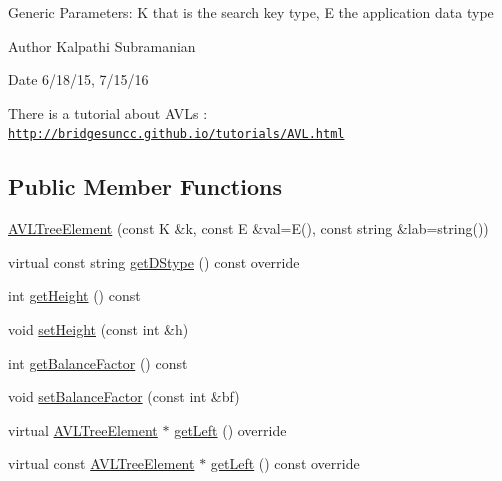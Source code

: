 Generic Parameters\+: K that is the search key type, E the application data type

\begin{DoxyAuthor}{Author}
Kalpathi Subramanian 
\end{DoxyAuthor}
\begin{DoxyDate}{Date}
6/18/15, 7/15/16
\end{DoxyDate}
There is a tutorial about A\+V\+Ls \+: \href{http://bridgesuncc.github.io/tutorials/AVL.html}{\tt http\+://bridgesuncc.\+github.\+io/tutorials/\+A\+V\+L.\+html} \subsection*{Public Member Functions}
\begin{DoxyCompactItemize}
\item 
\mbox{\hyperlink{classbridges_1_1datastructure_1_1_a_v_l_tree_element_a611fc818eeb478e330ef585adcefd9e6}{A\+V\+L\+Tree\+Element}} (const K \&k, const E \&val=E(), const string \&lab=string())
\item 
virtual const string \mbox{\hyperlink{classbridges_1_1datastructure_1_1_a_v_l_tree_element_ab04d1e9ad4630e408041e8137dc9854a}{get\+D\+Stype}} () const override
\item 
int \mbox{\hyperlink{classbridges_1_1datastructure_1_1_a_v_l_tree_element_a5d4b990d49f6f3d2f23f4dd3e57414e8}{get\+Height}} () const
\item 
void \mbox{\hyperlink{classbridges_1_1datastructure_1_1_a_v_l_tree_element_af387bcd2b37b7284ea983acafecff93c}{set\+Height}} (const int \&h)
\item 
int \mbox{\hyperlink{classbridges_1_1datastructure_1_1_a_v_l_tree_element_ade3c059448d00ac50dac89e59864b11f}{get\+Balance\+Factor}} () const
\item 
void \mbox{\hyperlink{classbridges_1_1datastructure_1_1_a_v_l_tree_element_a32af51a86585479c28de425374df95e9}{set\+Balance\+Factor}} (const int \&bf)
\item 
virtual \mbox{\hyperlink{classbridges_1_1datastructure_1_1_a_v_l_tree_element}{A\+V\+L\+Tree\+Element}} $\ast$ \mbox{\hyperlink{classbridges_1_1datastructure_1_1_a_v_l_tree_element_ab05925e343b9fa71b61c71e8034e1293}{get\+Left}} () override
\item 
virtual const \mbox{\hyperlink{classbridges_1_1datastructure_1_1_a_v_l_tree_element}{A\+V\+L\+Tree\+Element}} $\ast$ \mbox{\hyperlink{classbridges_1_1datastructure_1_1_a_v_l_tree_element_a4a639e0c623435aadf5c51ed132cb25d}{get\+Left}} () const override

\end{DoxyCompactItemize}
